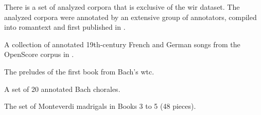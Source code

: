 

There is a set of analyzed corpora that is exclusive of the
\gls{wir} dataset. The analyzed corpora were annotated by an
extensive group of annotators, compiled into \gls{romantext}
and first published in \textcite{gotham2019romantext}.


A collection of annotated 19th-century French and German
songs from the OpenScore corpus in
\textcite{gotham2022openscore}.


The preludes of the first book from Bach's \gls{wtc}. 


A set of 20 annotated Bach chorales.


The set of Monteverdi madrigals in Books 3 to 5 (48 pieces).
